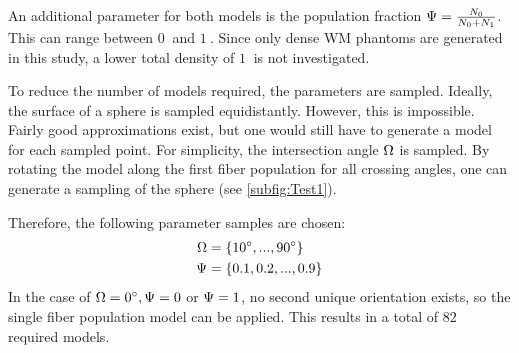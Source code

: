 \par
% 
An additional parameter for both models is the population fraction $\textnormal{$\Psi$}=\frac{N_0}{N_0+N_1}$.
This can range between $\SI{0}{}$ and $\SI{1}{}$.
Since only dense \ac{WM} phantoms are generated in this study, a lower total density of $\SI{1}{}$ is not investigated.
\par
%
To reduce the number of models required, the parameters are sampled.
Ideally, the surface of a sphere is sampled equidistantly.
However, this is impossible.
Fairly good approximations exist, but one would still have to generate a model for each sampled point.
For simplicity, the intersection angle $\textnormal{$\Omega$}$ is sampled.
By rotating the model along the first fiber population for all crossing angles, one can generate a sampling of the sphere (see \cref{subfig:Test1}).
\par
% 
Therefore, the following parameter samples are chosen:
% 
\begin{align}
    \begin{split}
        \textnormal{$\Omega$} &= \{\SI{10}{\degree}, ..., \SI{90}{\degree}\}\\
        \textnormal{$\Psi$} &= \{\SI{0.1}{}, \SI{0.2}{}, ..., \SI{0.9}{}\}
    \end{split}
\end{align}
% 
In the case of $\textnormal{$\Omega$} = \SI{0}{\degree}, \textnormal{$\Psi$} = 0$ or $\textnormal{$\Psi$} = 1$, no second unique orientation exists, so the single fiber population model can be applied.
This results in a total of $\SI{82}{}$ required models.
%
% 
% 
